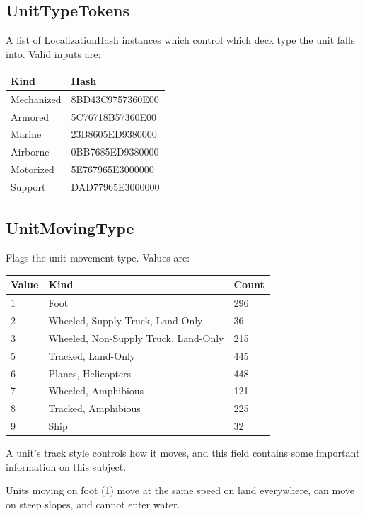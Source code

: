 \documentclass{article}
\begin{document}
\subsection{UnitTypeTokens}

A list of LocalizationHash instances which control which deck type the unit falls into. Valid inputs are:

\begin{center}
    \begin{tabular}{ | l | l |}
    \hline
	Kind & Hash\\ \hline
	Mechanized & 8BD43C9757360E00\\
	Armored & 5C76718B57360E00\\
	Marine & 23B8605ED9380000\\
	Airborne & 0BB7685ED9380000\\
	Motorized & 5E767965E3000000\\
	Support & DAD77965E3000000\\
    \hline
    \end{tabular}
\end{center}

\subsection{UnitMovingType}

Flags the unit movement type. Values are:

\begin{center}
    \begin{tabular}{ | l | l | l |}
    \hline
	Value & Kind & Count\\ \hline
	1 & Foot & 296\\
	2 & Wheeled, Supply Truck, Land-Only & 36\\
	3 & Wheeled, Non-Supply Truck, Land-Only & 215\\
	5 & Tracked, Land-Only & 445\\
	6 & Planes, Helicopters & 448\\
	7 & Wheeled, Amphibious & 121\\
	8 & Tracked, Amphibious & 225\\
	9 & Ship & 32\\
    \hline
    \end{tabular}
\end{center}

A unit's track style controls how it moves, and this field contains some important information on this subject.

Units moving on foot (1) move at the same speed on land everywhere, can move on steep slopes, and cannot enter water. 
\end{document}
